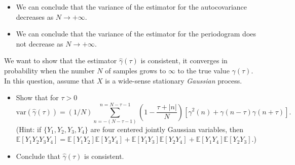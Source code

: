 \documentclass[11pt]{article}
\begin{document}
\begin{exercise}
\end{exercise}

\begin{solution}
    
    \begin{itemize}
        \item We can conclude that the variance of the estimator for the autocovariance decreases as $N \rightarrow + \infty$.
        \item We can conclude that the variance of the estimator for the periodogram does not decrease as $N \rightarrow + \infty$.
    \end{itemize}

\end{solution}

\begin{exercise}
    We want to show that the estimator $\hat{\gamma}(\tau)$ is consistent, \ie it converges in probability when the number $N$ of samples grows to $\infty$ to the true value ${\gamma}(\tau)$.
    In this question, assume that $X$ is a wide-sense stationary \textit{Gaussian} process.
    \begin{itemize}
        \item Show that for $\tau>0$ 
    \begin{equation}
       \text{var}(\hat{\gamma}(\tau)) = (1/N) \sum_{n=-(N-\tau-1)}^{n=N-\tau-1} \left(1 - \frac{\tau + |n|}{N}\right) \left[\gamma^2(n) + \gamma(n-\tau)\gamma(n+\tau)\right].
    \end{equation}
    (Hint: if $\{Y_1, Y_2, Y_3, Y_4\}$ are four centered jointly Gaussian variables, then $\mathbb{E}[Y_1 Y_2 Y_3 Y_4] = \mathbb{E}[Y_1 Y_2]\mathbb{E}[Y_3 Y_4] + \mathbb{E}[Y_1 Y_3]\mathbb{E}[Y_2 Y_4] + \mathbb{E}[Y_1 Y_4]\mathbb{E}[Y_2 Y_3]$.) 
    \item Conclude that $\hat{\gamma}(\tau)$ is consistent.
    \end{itemize}
\end{exercise}
\end{document}
